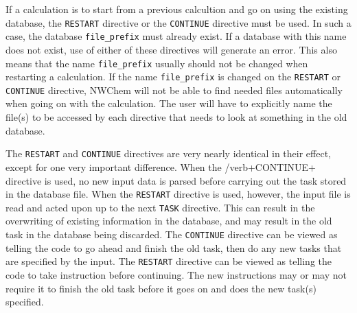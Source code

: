 If a calculation is to start from a previous calcultion and go on
using the existing database, the \verb+RESTART+ directive or the
\verb+CONTINUE+ directive must be used.  In such a case, the database
\verb+file_prefix+ must already exist.  If a database with this name 
does not exist, use of either of these directives will generate an error.
This also means that the name {\tt file\_prefix} usually should not be 
changed when restarting a calculation.  If the name {\tt file\_prefix} is 
changed on the \verb+RESTART+ or \verb+CONTINUE+ directive, 
NWChem will not be able to
find needed files automatically when going on with the calculation.
The user will have to explicitly name the file(s) to be accessed by each
directive that needs to look at something in the old database.

The \verb+RESTART+ and \verb+CONTINUE+ directives are very nearly identical
in their effect, except for one very important difference.  When the
/verb+CONTINUE+ directive is used, no new input data is parsed before
carrying out the task stored in the database file.  When the \verb+RESTART+
directive is used, however, the input file is read and acted upon up to
the next \verb+TASK+ directive.  This can result in the overwriting of
existing information in the database, and may result in the old task in
the database being discarded.
% 
The \verb+CONTINUE+ directive can be viewed as telling the code to
go ahead and finish the old task, then do any new tasks that are
specified by the input. The \verb+RESTART+ directive can 
be viewed as telling the code to take instruction before continuing.  The
new instructions may or may not require it to finish the old task before 
it goes on and does the new task(s) specified.

